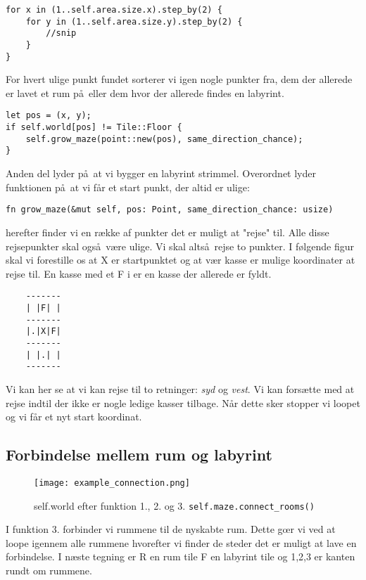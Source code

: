 \documentclass[12pt]{article}
\begin{document}
\begin{verbatim}
for x in (1..self.area.size.x).step_by(2) {
    for y in (1..self.area.size.y).step_by(2) {
		//snip
    }
}
\end{verbatim}

For hvert ulige punkt fundet sorterer vi igen nogle punkter fra, dem der allerede er lavet et rum p\aa\ eller dem hvor der allerede findes en labyrint.

\begin{verbatim}
let pos = (x, y);
if self.world[pos] != Tile::Floor {
    self.grow_maze(point::new(pos), same_direction_chance);
}
\end{verbatim}

Anden del lyder p\aa\ at vi bygger en labyrint strimmel. Overordnet lyder funktionen p\aa\ at vi f\aa r et start punkt, der altid er ulige:
\begin{verbatim}
fn grow_maze(&mut self, pos: Point, same_direction_chance: usize)
\end{verbatim}

herefter finder vi en r\ae kke af punkter det er muligt at "rejse" til. Alle disse rejsepunkter skal ogs\aa\ v\ae re ulige. Vi skal alts\aa\ rejse to punkter. I f\o lgende figur skal vi forestille os at X er startpunktet og at v\ae r kasse er mulige koordinater at rejse til. En kasse med et F i er en kasse der allerede er fyldt.

\begin{verbatim}
	-------
	| |F| |
	-------
	|.|X|F|
	-------
	| |.| |
	-------
\end{verbatim}

Vi kan her se at vi kan rejse til to retninger: \textit{syd} og \textit{vest}. Vi kan fors\ae tte med at rejse indtil der ikke er nogle ledige kasser tilbage. N\aa r dette sker stopper vi loopet og vi f\aa r et nyt start koordinat.

\vfill
\pagebreak

\subsection{Forbindelse mellem rum og labyrint}

\begin{figure}[h]
	\centering
	\texttt{[image: example\_connection.png]}
	\caption{self.world efter funktion 1., 2. og 3. \texttt{self.maze.connect_rooms()}}
\end{figure}

I funktion 3. forbinder vi rummene til de nyskabte rum. Dette g\oe r vi ved at loope igennem alle rummene hvorefter vi finder de steder det er muligt at lave en forbindelse. I n\ae ste tegning er R en rum tile F en labyrint tile og 1,2,3 er kanten rundt om rummene.
\end{document}
